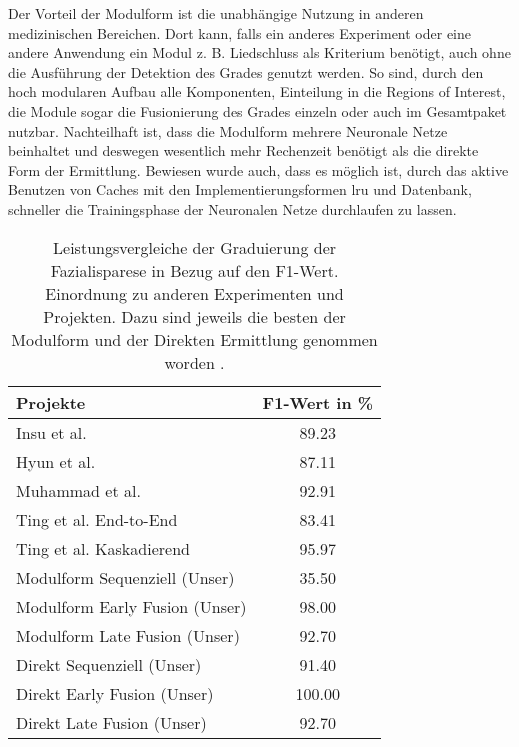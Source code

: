 Der Vorteil der Modulform ist die unabhängige Nutzung in anderen medizinischen Bereichen. Dort kann, falls ein anderes Experiment oder eine andere Anwendung ein Modul z. B. Liedschluss als Kriterium benötigt, auch ohne die Ausführung der Detektion des Grades genutzt werden. So sind, durch den hoch modularen Aufbau alle Komponenten, Einteilung in die Regions of Interest, die Module sogar die Fusionierung des Grades einzeln oder auch im Gesamtpaket nutzbar. Nachteilhaft ist, dass die Modulform mehrere Neuronale Netze beinhaltet und deswegen wesentlich mehr Rechenzeit benötigt als die direkte Form der Ermittlung. Bewiesen wurde auch, dass es möglich ist, durch das aktive Benutzen von Caches mit den Implementierungsformen \ac{lru} und Datenbank, schneller die Trainingsphase der Neuronalen Netze durchlaufen zu lassen.

\begin{table}[!h]\vspace{3ex}\centering
  \begin{tabular}{l||c|}
  \textbf{Projekte}                           & \textbf{F1-Wert in \%} \\ \hline\hline
  Insu et al. \cite{6583060}                    & 89.23   \\
  Hyun et al. \cite{s151026756}                 & 87.11   \\
  Muhammad et al. \cite{sym10070242}            & 92.91   \\
  Ting et al. End-to-End \cite{detection_fp2}   & 83.41   \\
  Ting et al. Kaskadierend \cite{detection_fp2} & 95.97   \\ \hline
  Modulform Sequenziell (Unser)                 & 35.50   \\
  Modulform Early Fusion (Unser)                & 98.00   \\
  Modulform Late Fusion (Unser)                 & 92.70   \\
  Direkt Sequenziell (Unser)                    & 91.40   \\
  Direkt Early Fusion (Unser)                   & 100.00  \\
  Direkt Late Fusion (Unser)                    & 92.70   \\ \hline
  \end{tabular}
  \caption[Leistungsvergleiche der Graduierung der Fazialisparese von verschiedenen Projekten]{Leistungsvergleiche der Graduierung der Fazialisparese in Bezug auf den F1-Wert. Einordnung zu anderen Experimenten und Projekten. Dazu sind jeweils die besten der Modulform und der Direkten Ermittlung genommen worden \cite{detection_fp2}.}\label{cap:ref_tab}
\vspace{1ex}\end{table}\label{table:ref_tab}

